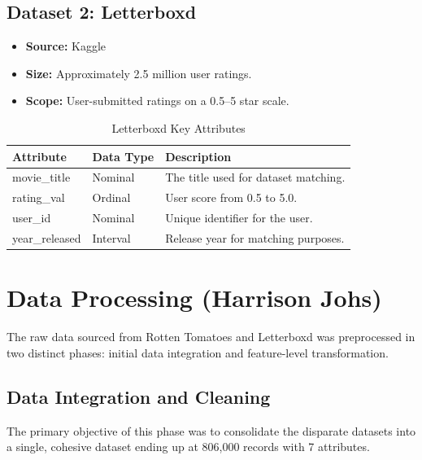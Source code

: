 \documentclass[conference]{IEEEtran}
\begin{document}
\subsection{Dataset 2: Letterboxd}
\begin{itemize}
  \item \textbf{Source:} Kaggle \cite{letterboxd2020}
  \item \textbf{Size:} Approximately 2.5 million user ratings.
  \item \textbf{Scope:} User-submitted ratings on a 0.5--5 star scale.
\end{itemize}

\begin{table}[htbp]
  \caption{Letterboxd Key Attributes}
  \begin{center}
    \begin{tabularx}{\columnwidth}{|l|l|X|}
      \hline
      \textbf{Attribute} & \textbf{Data Type} & \textbf{Description}                 \\ \hline
      movie\_title       & Nominal            & The title used for dataset matching. \\ \hline
      rating\_val        & Ordinal            & User score from 0.5 to 5.0.          \\ \hline
      user\_id           & Nominal            & Unique identifier for the user.      \\ \hline
      year\_released     & Interval           & Release year for matching purposes.  \\ \hline
    \end{tabularx}
    \label{tab2}
  \end{center}
\end{table}

\section{Data Processing (Harrison Johs)}
The raw data sourced from Rotten Tomatoes and Letterboxd was preprocessed in two distinct phases: initial data integration and feature-level transformation.

\subsection{Data Integration and Cleaning}
The primary objective of this phase was to consolidate the disparate datasets into a single, cohesive dataset ending up at 806,000 records with 7 attributes.
\end{document}
